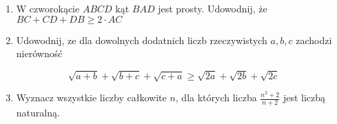 \documentclass[10pt]{article}
\begin{document}
\begin{enumerate}
  \item W czworokącie \(A B C D\) kąt \(B A D\) jest prosty. Udowodnij, że \(B C+C D+D B \geq 2 \cdot A C\)
  \item Udowodnij, ze dla dowolnych dodatnich liczb rzeczywistych \(a, b, c\) zachodzi nierówność
\end{enumerate}

\[
\sqrt{a+b}+\sqrt{b+c}+\sqrt{c+a} \geq \sqrt{2 a}+\sqrt{2 b}+\sqrt{2 c}
\]

\begin{enumerate}
  \setcounter{enumi}{2}
  \item Wyznacz wszystkie liczby całkowite \(n\), dla których liczba \(\frac{n^{2}+2}{n+2}\) jest liczbą naturalną.
\end{enumerate}
\end{document}
